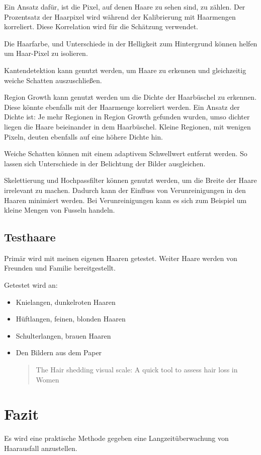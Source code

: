 \documentclass[german,a4paper,12pt]{llncs}
\begin{document}
Ein Ansatz dafür, ist die Pixel, auf denen Haare zu sehen sind, zu zählen. Der Prozentsatz der Haarpixel wird während der Kalibrierung mit Haarmengen korreliert. Diese Korrelation wird für die Schätzung verwendet.
 
Die Haarfarbe, und Unterschiede in der Helligkeit zum Hintergrund können helfen um Haar-Pixel zu isolieren. 

Kantendetektion kann genutzt werden, um Haare zu erkennen und gleichzeitig weiche Schatten auszuschließen.  

Region Growth kann genutzt werden um die Dichte der Haarbüschel zu erkennen. Diese könnte ebenfalls mit der Haarmenge korreliert werden. Ein Ansatz der Dichte ist: Je mehr Regionen in Region Growth gefunden wurden, umso dichter liegen die Haare beieinander in dem Haarbüschel. Kleine Regionen, mit wenigen Pixeln, deuten ebenfalls auf eine höhere Dichte hin. 

Weiche Schatten können mit einem adaptivem Schwellwert entfernt werden. So lassen sich Unterschiede in der Belichtung der Bilder ausgleichen. 

Skelettierung und Hochpassfilter können genutzt werden, um die Breite der Haare irrelevant zu machen. Dadurch kann der Einfluss von Verunreinigungen in den Haaren minimiert werden. Bei Verunreinigungen kann es sich zum Beispiel um kleine Mengen von Fusseln handeln.

\subsection{Testhaare}

Primär wird mit meinen eigenen Haaren getestet. Weiter Haare werden von Freunden und Familie bereitgestellt.

Getestet wird an:
\begin{itemize}
	\item Knielangen, dunkelroten Haaren
	\item Hüftlangen, feinen, blonden Haaren
	\item Schulterlangen, brauen Haaren
	\item Den Bildern aus dem Paper \blockquote{The Hair shedding visual scale: A quick tool to assess hair loss in Women} 
\end{itemize}



\section{Fazit}
Es wird eine praktische Methode gegeben eine Langzeitüberwachung von Haarausfall anzustellen. 
\end{document}

